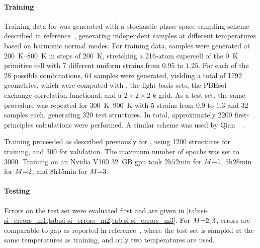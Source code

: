\paragraph{Training}
Training data for  was generated with a stochastic phase-space sampling scheme described in reference~\cite{shm2017t}, generating independent samples at different temperatures based on harmonic normal modes. For training data, samples were generated at \qtyrange{200}{800}{K} in steps of \qty{200}{K}, stretching a \num{216}-atom supercell of the \qty{0}{K} primitive cell with \num{7} different uniform strains from $0.95$ to $1.25$. For each of the \num{28} possible combinations, \num{64} samples were generated, yielding a total of \num{1792} geometries, which were computed with \aims, the light basis sets, the PBEsol~\cite{przb2008t} exchange-correlation functional, and a $2\times2\times2$ $k$-grid. As a test set, the same procedure was repeated for \qtyrange{300}{900}{K} with \num{5} strains from $0.9$ to $1.3$ and \num{32} samples each, generating \num{320} test structures. In total, approximately \num{2200} first-principles calculations were performed. A similar scheme was used by Qian~\etal~\cite{qpwy2019q}.

Training proceeded as described previously for , using \num{1200} structures for training, and \num{300} for validation. The maximum number of epochs was set to \num{3000}. Training on an Nvidia V100 \qty{32}{GB} \gls{gpu} took $2$h$52$min for $M{=}1$, $5$h$28$min for $M{=}2$, and $8$h$15$min for $M{=}3$.

\paragraph{Testing}


Errors on the test set were evaluated first and are given in \cref{tab:si-si_errors_m1,tab:si-si_errors_m2,tab:si-si_errors_m3}. For $M{=}2,3$, errors are comparable to \gls{gap} as reported in reference~\cite{qpwy2019q}, where the test set is sampled at the same temperatures as training, and only two temperatures are used.

